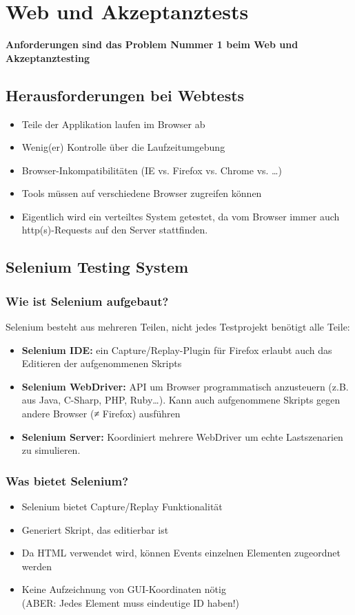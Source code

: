 \documentclass[a4paper,10pt]{article}
\newcommand{\Bold}[1]{\textbf{#1}} %
\begin{document}
\section{Web und Akzeptanztests}
\textbf{\Bold Anforderungen sind das Problem Nummer 1 beim Web und Akzeptanztesting}\\
\subsection{Herausforderungen bei Webtests}
\begin{itemize}
\item Teile der Applikation laufen im Browser ab
\item Wenig(er) Kontrolle über die Laufzeitumgebung
\item Browser-Inkompatibilit\"aten (IE vs. Firefox vs. Chrome vs. …)
\item Tools müssen auf verschiedene Browser zugreifen k\"onnen
\item Eigentlich wird ein verteiltes System getestet, da vom Browser immer auch http(s)-Requests auf den Server stattfinden.
\end{itemize}

\subsection{Selenium Testing System}
\subsubsection{Wie ist Selenium aufgebaut?}
Selenium besteht aus mehreren Teilen, nicht jedes Testprojekt ben\"otigt alle Teile:
\begin{itemize}
\item \textbf{\Bold Selenium IDE:} ein Capture/Replay-Plugin für Firefox erlaubt auch das Editieren der aufgenommenen Skripts
\item \textbf{\Bold Selenium WebDriver:} API um Browser programmatisch anzusteuern (z.B. aus Java, C-Sharp, PHP, Ruby…). Kann auch aufgenommene Skripts gegen andere Browser (≠ Firefox) ausführen
\item \textbf{\Bold Selenium Server:} Koordiniert mehrere WebDriver um echte Lastszenarien zu simulieren.

\end{itemize}

\subsubsection{Was bietet Selenium?}
\begin{itemize}
\item Selenium bietet Capture/Replay Funktionalit\"at
\item Generiert Skript, das editierbar ist
\item Da HTML verwendet wird, k\"onnen Events einzelnen Elementen zugeordnet werden
\item Keine Aufzeichnung von GUI-Koordinaten n\"otig\\
(ABER: Jedes Element muss eindeutige ID haben!)
\end{itemize}
\end{document}
